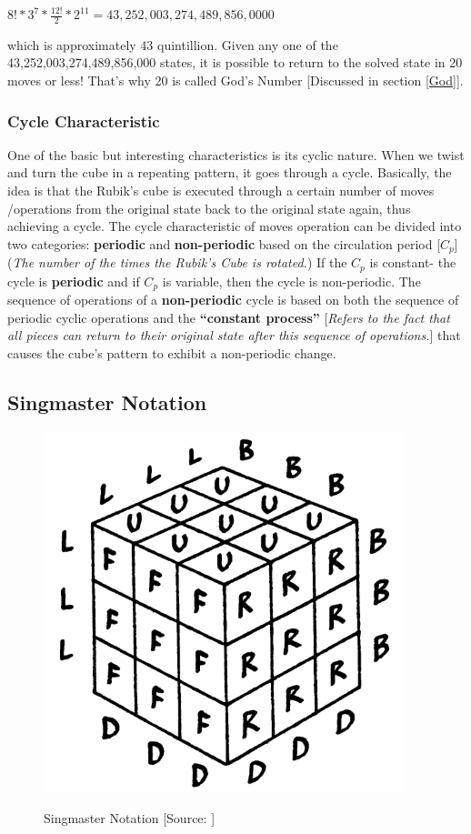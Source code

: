 \documentclass[12pt,a4paper]{article}
\theoremstyle{custom}
\begin{document}
\begin{center}
    $\boxed{8! * 3^{7} * \frac{12!}{2} * 2^{11}  = 43,252,003,274,489,856,0000}$
\end{center}
which is approximately $43$ quintillion.
Given any one of
the 43,252,003,274,489,856,000 states, it is possible to return to the solved state in 20
moves or less! That’s why 20 is called God’s Number [Discussed in section \ref{God}].
\subsubsection{Cycle Characteristic}
One of the basic but interesting characteristics is its cyclic nature. 
When we twist and turn the cube in a repeating pattern, it goes through a cycle. Basically, the idea is that the Rubik's cube is executed through a certain
number of moves /operations from the original state back to the original state again, thus achieving a cycle. The cycle characteristic of moves operation can be
divided into two categories: \textbf{periodic} and \textbf{non-periodic} based on the circulation period [$C_p$] (\textit{The number of the times the Rubik's Cube is rotated.})
If the $C_p$ is constant- the cycle is \textbf{periodic} and if $C_p$ is variable, then the cycle is non-periodic. The sequence of operations of a \textbf{non-periodic} cycle is
based on both the sequence of periodic cyclic operations
and the \textbf{“constant process”} [\textit{Refers to
the fact that all pieces can return to their original state
after this sequence of operations.}] that causes the cube’s pattern to exhibit a non-periodic change.


\subsection{Singmaster Notation}

\begin{figure}[H]
\centering
\includegraphics[scale=0.5]{SingNotation.png} \\
\caption{Singmaster Notation [Source: \cite{singmaster1980notes}]}
\label{Sing}
\end{figure}
\end{document}
